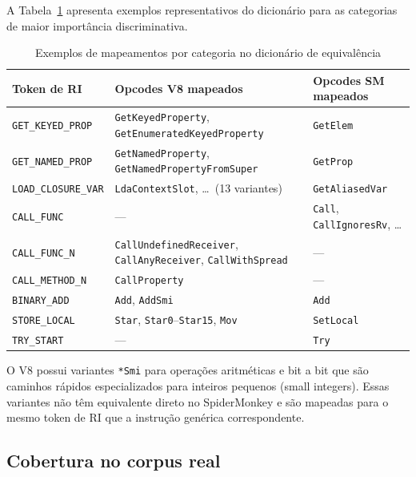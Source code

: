 A Tabela~\ref{tab:dict-exemplos} apresenta exemplos representativos do dicionário
para as categorias de maior importância discriminativa.

\begin{table}[htb]
\centering
\caption{Exemplos de mapeamentos por categoria no dicionário de equivalência}
\label{tab:dict-exemplos}
\begin{tabularx}{\linewidth}{l>{\raggedright\arraybackslash}X>{\raggedright\arraybackslash}X}
\toprule
\textbf{Token de RI} & \textbf{Opcodes V8 mapeados} & \textbf{Opcodes SM mapeados} \\
\midrule
\texttt{GET\_KEYED\_PROP}   & \texttt{GetKeyedProperty}, \texttt{GetEnumeratedKeyedProperty} & \texttt{GetElem} \\
\texttt{GET\_NAMED\_PROP}   & \texttt{GetNamedProperty}, \texttt{GetNamedPropertyFromSuper} & \texttt{GetProp} \\
\texttt{LOAD\_CLOSURE\_VAR} & \texttt{LdaContextSlot}, \ldots\ (13 variantes) & \texttt{GetAliasedVar} \\
\texttt{CALL\_FUNC}         & --- & \texttt{Call}, \texttt{CallIgnoresRv}, \ldots \\
\texttt{CALL\_FUNC\_N}      & \texttt{CallUndefinedReceiver}, \texttt{CallAnyReceiver}, \texttt{CallWithSpread} & --- \\
\texttt{CALL\_METHOD\_N}    & \texttt{CallProperty} & --- \\
\texttt{BINARY\_ADD}        & \texttt{Add}, \texttt{AddSmi} & \texttt{Add} \\
\texttt{STORE\_LOCAL}       & \texttt{Star}, \texttt{Star0}--\texttt{Star15}, \texttt{Mov} & \texttt{SetLocal} \\
\texttt{TRY\_START}         & ---                                                     & \texttt{Try} \\
\bottomrule
\end{tabularx}
\end{table}

O V8 possui variantes \texttt{*Smi} para operações aritméticas e bit a bit que são
caminhos rápidos especializados para inteiros pequenos (small integers).
Essas variantes não têm equivalente direto no SpiderMonkey e são mapeadas para o
mesmo token de RI que a instrução genérica correspondente.

\subsection{Cobertura no corpus real}
\label{sub:dict-cobertura}


